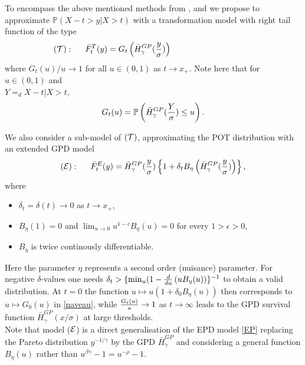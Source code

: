 To encompass the above mentioned methods from \cite{beirlant2009second}, \cite{naveau2016modeling} and \cite{tencaliec2018flexible} we propose to approximate $\mathbb{P}\left(X-t >y| X>t \right)$ with a transformation model with right tail function of the type
\[\hspace{-3.5cm} ({\cal{T}}): \hspace{0.5cm}
\bar{F}^T_t (y) = G_t \left(\bar{H}^{GP}_{\gamma}({y \over \sigma})\right)
\]
where $G_t(u)/u \to 1$ for all $u \in (0,1)$ as $t \to x_+$. Note here that for $u \in (0,1)$ and \\ $Y=_d X-t|X>t$, 
\begin{equation}
G_t (u) = \mathbb{P} \left(\bar{H}^{GP}_{\gamma}({Y \over \sigma}) \leq u\right).
\label{Gt}
\end{equation} 

\noindent
We also consider a sub-model of $({\cal{T}})$, approximating the POT distribution with an extended GPD model
\[
({\cal{E}}) : \hspace{0.5cm} \bar{F}^E_t(y)= \bar{H}^{GP}_\gamma ({y \over \sigma})\left\{1 +\delta_t B_{\eta} \left( \bar{H}^{GP}_\gamma ( {y \over \sigma}) \right) \right\}, 
\]
where 
\begin{itemize}
\item $\delta_t =\delta (t) \to 0$ as $t \to x_+$,
\item $B_{\eta} (1)=0$ and $\lim_{u \to 0} u^{1-\epsilon}B_{\eta}(u)=0$ for every $1>\epsilon >0$,
\item $B_{\eta}$ is twice continously differentiable. 
\end{itemize}
Here the parameter $\eta$ represents a second order (nuisance) parameter. 
For negative $\delta$-values one needs $\delta_t > \{\min_u (1-{d \over du}\, (uB_{\eta}(u))\}^{-1}$ to obtain a valid distribution. 
At $t=0$ the function $u \mapsto u(1+\delta_0 B_{\eta}(u))$ then corresponds to $u \mapsto G_0(u)$ in \eqref{naveau}, while ${G_t (u) \over u} \to 1$ as $t \to \infty$ leads to the GPD survival function $\bar{H}^{GP}_\gamma (x/\sigma)$ at large thresholds.
\\
Note that model ($\cal{E}$) is a direct generalisation of the EPD model \eqref{EP} replacing the Pareto distribution $y^{-1/\gamma}$ by the GPD $\bar{H}^{GP}_\gamma$ and considering a general function $B_\eta (u)$ rather than $ u^{\beta\gamma}-1 = u^{-\rho}-1$. 
\\
 
